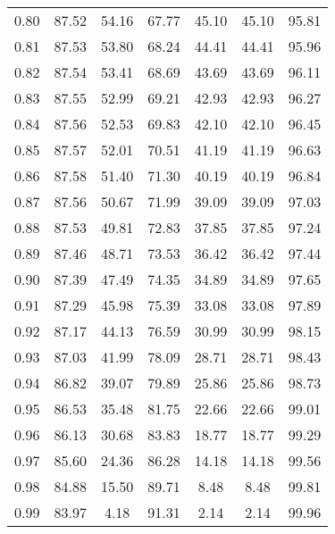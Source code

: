 \begin{tabular}{|c|c|c|c|c|c|c|}
      0.80 &     87.52 &     54.16 &      67.77 &   45.10 &      45.10 &         95.81 \\
      0.81 &     87.53 &     53.80 &      68.24 &   44.41 &      44.41 &         95.96 \\
      0.82 &     87.54 &     53.41 &      68.69 &   43.69 &      43.69 &         96.11 \\
      0.83 &     87.55 &     52.99 &      69.21 &   42.93 &      42.93 &         96.27 \\
      0.84 &     87.56 &     52.53 &      69.83 &   42.10 &      42.10 &         96.45 \\
      0.85 &     87.57 &     52.01 &      70.51 &   41.19 &      41.19 &         96.63 \\
      0.86 &     87.58 &     51.40 &      71.30 &   40.19 &      40.19 &         96.84 \\
      0.87 &     87.56 &     50.67 &      71.99 &   39.09 &      39.09 &         97.03 \\
      0.88 &     87.53 &     49.81 &      72.83 &   37.85 &      37.85 &         97.24 \\
      0.89 &     87.46 &     48.71 &      73.53 &   36.42 &      36.42 &         97.44 \\
      0.90 &     87.39 &     47.49 &      74.35 &   34.89 &      34.89 &         97.65 \\
      0.91 &     87.29 &     45.98 &      75.39 &   33.08 &      33.08 &         97.89 \\
      0.92 &     87.17 &     44.13 &      76.59 &   30.99 &      30.99 &         98.15 \\
      0.93 &     87.03 &     41.99 &      78.09 &   28.71 &      28.71 &         98.43 \\
      0.94 &     86.82 &     39.07 &      79.89 &   25.86 &      25.86 &         98.73 \\
      0.95 &     86.53 &     35.48 &      81.75 &   22.66 &      22.66 &         99.01 \\
      0.96 &     86.13 &     30.68 &      83.83 &   18.77 &      18.77 &         99.29 \\
      0.97 &     85.60 &     24.36 &      86.28 &   14.18 &      14.18 &         99.56 \\
      0.98 &     84.88 &     15.50 &      89.71 &    8.48 &       8.48 &         99.81 \\
      0.99 &     83.97 &      4.18 &      91.31 &    2.14 &       2.14 &         99.96 \\
\bottomrule
\end{tabular}

